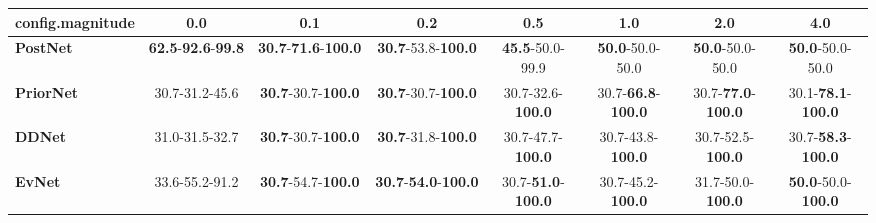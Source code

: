 \begin{tabular}{lccccccc}
\toprule
\textbf{config.magnitude} &                                        0.0 &                                         0.1 &                                         0.2 &                                0.5 &                                1.0 &                                2.0 &                                4.0 \\
\midrule
\textbf{PostNet } &  \textbf{62.5}-\textbf{92.6}-\textbf{99.8} &  \textbf{30.7}-\textbf{71.6}-\textbf{100.0} &           \textbf{30.7}-53.8-\textbf{100.0} &            \textbf{45.5}-50.0-99.9 &            \textbf{50.0}-50.0-50.0 &            \textbf{50.0}-50.0-50.0 &            \textbf{50.0}-50.0-50.0 \\
\textbf{PriorNet} &                             30.7-31.2-45.6 &           \textbf{30.7}-30.7-\textbf{100.0} &           \textbf{30.7}-30.7-\textbf{100.0} &           30.7-32.6-\textbf{100.0} &  30.7-\textbf{66.8}-\textbf{100.0} &  30.7-\textbf{77.0}-\textbf{100.0} &                        30.1-\textbf{78.1}-\textbf{100.0} \\
\textbf{DDNet   } &                             31.0-31.5-32.7 &           \textbf{30.7}-30.7-\textbf{100.0} &           \textbf{30.7}-31.8-\textbf{100.0} &           30.7-47.7-\textbf{100.0} &           30.7-43.8-\textbf{100.0} &           30.7-52.5-\textbf{100.0} &  30.7-\textbf{58.3}-\textbf{100.0} \\
\textbf{EvNet   } &                             33.6-55.2-91.2 &           \textbf{30.7}-54.7-\textbf{100.0} &  \textbf{30.7}-\textbf{54.0}-\textbf{100.0} &  30.7-\textbf{51.0}-\textbf{100.0} &           30.7-45.2-\textbf{100.0} &           31.7-50.0-\textbf{100.0} &  \textbf{50.0}-50.0-\textbf{100.0} \\
\bottomrule
\end{tabular}
